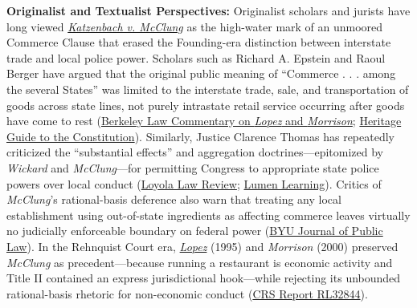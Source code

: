 \documentclass[12pt]{article}
\begin{document}
\textbf{Originalist and Textualist Perspectives:} Originalist scholars and jurists have long viewed \href{https://www.courtlistener.com/opinion/106951/katzenbach-v-mcclung/}{\textit{Katzenbach v. McClung}} as the high-water mark of an unmoored Commerce Clause that erased the Founding-era distinction between interstate trade and local police power. Scholars such as Richard A. Epstein and Raoul Berger have argued that the original public meaning of ``Commerce . . . among the several States'' was limited to the interstate trade, sale, and transportation of goods across state lines, not purely intrastate retail service occurring after goods have come to rest (\href{https://lawcat.berkeley.edu/record/1118252/files/fulltext.pdf}{Berkeley Law Commentary on \textit{Lopez} and \textit{Morrison}}; \href{https://constitution.heritage.org/essays/a1-s8-c3-b/}{Heritage Guide to the Constitution}). Similarly, Justice Clarence Thomas has repeatedly criticized the ``substantial effects'' and aggregation doctrines---epitomized by \textit{Wickard} and \textit{McClung}---for permitting Congress to appropriate state police powers over local conduct (\href{https://dspace.loyno.edu/jspui/bitstream/123456789/131/1/Article\%204\%20-\%20McGoldrick_PRINT.pdf}{Loyola Law Review}; \href{https://courses.lumenlearning.com/clinton-buslegalenv/chapter/4-2-the-commerce-clause/}{Lumen Learning}). Critics of \textit{McClung}'s rational-basis deference also warn that treating any local establishment using out-of-state ingredients as affecting commerce leaves virtually no judicially enforceable boundary on federal power (\href{https://digitalcommons.law.byu.edu/cgi/viewcontent.cgi?article=1252&context=jpl}{BYU Journal of Public Law}). In the Rehnquist Court era, \href{https://supreme.justia.com/cases/federal/us/514/549/}{\textit{Lopez}} (1995) and \textit{Morrison} (2000) preserved \textit{McClung} as precedent---because running a restaurant is economic activity and Title II contained an express jurisdictional hook---while rejecting its unbounded rational-basis rhetoric for non-economic conduct (\href{https://www.everycrsreport.com/reports/RL32844.html}{CRS Report RL32844}).
\end{document}
